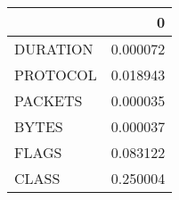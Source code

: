 \begin{tabular}{lr}
\toprule
{} &         0 \\
\midrule
DURATION &  0.000072 \\
PROTOCOL &  0.018943 \\
PACKETS  &  0.000035 \\
BYTES    &  0.000037 \\
FLAGS    &  0.083122 \\
CLASS    &  0.250004 \\
\bottomrule
\end{tabular}
